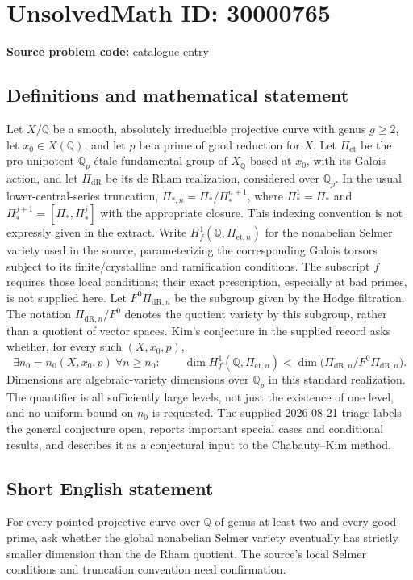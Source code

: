 \documentclass[11pt]{article}
\newcommand{\Q}{\mathbb{Q}}
\begin{document}
\section*{UnsolvedMath ID: 30000765}
\textbf{Source problem code:} catalogue entry
\subsection{Definitions and mathematical statement}
Let $X/\Q$ be a smooth, absolutely irreducible projective curve with genus $g\geq2$, let $x_0\in X(\Q)$, and let $p$ be a prime of good reduction for $X$. Let $\Pi_{\mathrm{et}}$ be the pro-unipotent $\Q_p$-\'etale fundamental group of $X_{\overline{\Q}}$ based at $x_0$, with its Galois action, and let $\Pi_{\mathrm{dR}}$ be its de Rham realization, considered over $\Q_p$. In the usual lower-central-series truncation, $\Pi_{*,n}=\Pi_*/\Pi_*^{n+1}$, where $\Pi_*^1=\Pi_*$ and $\Pi_*^{j+1}=[\Pi_*,\Pi_*^j]$ with the appropriate closure. This indexing convention is not expressly given in the extract. Write $H_f^1(\Q,\Pi_{\mathrm{et},n})$ for the nonabelian Selmer variety used in the source, parameterizing the corresponding Galois torsors subject to its finite/crystalline and ramification conditions. The subscript $f$ requires those local conditions; their exact prescription, especially at bad primes, is not supplied here. Let $F^0\Pi_{\mathrm{dR},n}$ be the subgroup given by the Hodge filtration. The notation $\Pi_{\mathrm{dR},n}/F^0$ denotes the quotient variety by this subgroup, rather than a quotient of vector spaces. Kim's conjecture in the supplied record asks whether, for every such $(X,x_0,p)$, \[\exists n_0=n_0(X,x_0,p)\ \forall n\geq n_0:\qquad \dim H_f^1(\Q,\Pi_{\mathrm{et},n})<\dim\bigl(\Pi_{\mathrm{dR},n}/F^0\Pi_{\mathrm{dR},n}\bigr).\] Dimensions are algebraic-variety dimensions over $\Q_p$ in this standard realization. The quantifier is all sufficiently large levels, not just the existence of one level, and no uniform bound on $n_0$ is requested. The supplied 2026-08-21 triage labels the general conjecture open, reports important special cases and conditional results, and describes it as a conjectural input to the Chabauty--Kim method.
\subsection{Short English statement}
For every pointed projective curve over $\Q$ of genus at least two and every good prime, ask whether the global nonabelian Selmer variety eventually has strictly smaller dimension than the de Rham quotient. The source's local Selmer conditions and truncation convention need confirmation.
\end{document}
